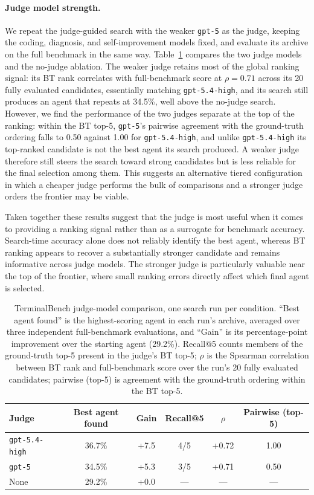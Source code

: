 \documentclass{article}
\begin{document}
\paragraph{Judge model strength.}
We repeat the judge-guided search with the weaker \texttt{gpt-5} as the judge, keeping the coding, diagnosis, and self-improvement models fixed, and evaluate its archive on the full benchmark in the same way.
Table~\ref{tab:terminalbench_judge_strength} compares the two judge models and the no-judge ablation.
The weaker judge retains most of the global ranking signal: its BT rank correlates with full-benchmark score at $\rho=0.71$ across its 20 fully evaluated candidates, essentially matching \texttt{gpt-5.4-high}, and its search still produces an agent that repeats at 34.5\%, well above the no-judge search.
However, we find the performance of the two judges separate at the top of the ranking: within the BT top-5, \texttt{gpt-5}'s pairwise agreement with the ground-truth ordering falls to 0.50 against 1.00 for \texttt{gpt-5.4-high}, and unlike \texttt{gpt-5.4-high} its top-ranked candidate is not the best agent its search produced.
A weaker judge therefore still steers the search toward strong candidates but is less reliable for the final selection among them. This suggests an alternative tiered configuration in which a cheaper judge performs the bulk of comparisons and a stronger judge orders the frontier may be viable.

Taken together these results suggest that the judge is most useful when it comes to providing a ranking signal rather than as a surrogate for benchmark accuracy. Search-time accuracy alone does not reliably identify the best agent, whereas BT ranking appears to recover a substantially stronger candidate and remains informative across judge models. The stronger judge is particularly valuable near the top of the frontier, where small ranking errors directly affect which final agent is selected.

\newpage

\begin{table}[t]
\centering
\small
\caption{TerminalBench judge-model comparison, one search run per condition. ``Best agent found'' is the highest-scoring agent in each run's archive, averaged over three independent full-benchmark evaluations, and ``Gain'' is its percentage-point improvement over the starting agent (29.2\%). Recall@5 counts members of the ground-truth top-5 present in the judge's BT top-5; $\rho$ is the Spearman correlation between BT rank and full-benchmark score over the run's 20 fully evaluated candidates; pairwise (top-5) is agreement with the ground-truth ordering within the BT top-5.}
\label{tab:terminalbench_judge_strength}
\begin{tabular}{lccccc}
\toprule
Judge & Best agent found & Gain & Recall@5 & $\rho$ & Pairwise (top-5) \\
\midrule
\texttt{gpt-5.4-high} & 36.7\% & +7.5 & 4/5 & +0.72 & 1.00 \\
\texttt{gpt-5} & 34.5\% & +5.3 & 3/5 & +0.71 & 0.50 \\
None & 29.2\% & +0.0 & --- & --- & --- \\
\bottomrule
\end{tabular}
\end{table}
 
\end{document}
